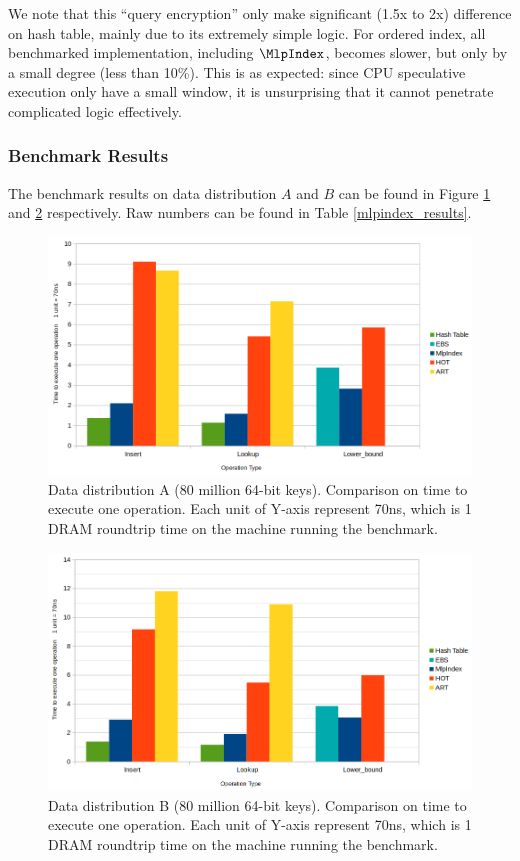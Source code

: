 \documentclass[11pt, usletter]{article}
\begin{document}
We note that this ``query encryption'' only make significant (1.5x to 2x) difference on hash table, mainly due to its extremely simple logic. 
For ordered index, all benchmarked implementation, including $\MlpIndex$, becomes slower, but only by a small degree (less than 10\%). 
This is as expected: since CPU speculative execution only have a small window, it is unsurprising that it 
cannot penetrate complicated logic effectively. 

\subsubsection*{Benchmark Results}

The benchmark results on data distribution $A$ and $B$ can be found in Figure \ref{mlpindex_distA} and \ref{mlpindex_distB} respectively.
Raw numbers can be found in Table \ref{mlpindex_results}.

\begin{figure}[!htb]
\centering
  \includegraphics[width=0.8\linewidth]{mlpindex_result1.png}
\caption{Data distribution A (80 million 64-bit keys). Comparison on time to execute one operation. 
Each unit of Y-axis represent 70ns, which is 1 DRAM roundtrip time on the machine running the benchmark.}
\label{mlpindex_distA}
\end{figure}

\begin{figure}[!htb]
\centering
  \includegraphics[width=0.8\linewidth]{mlpindex_result2.png}
\caption{Data distribution B (80 million 64-bit keys). Comparison on time to execute one operation. 
Each unit of Y-axis represent 70ns, which is 1 DRAM roundtrip time on the machine running the benchmark.}
\label{mlpindex_distB}
\end{figure}
\end{document}
